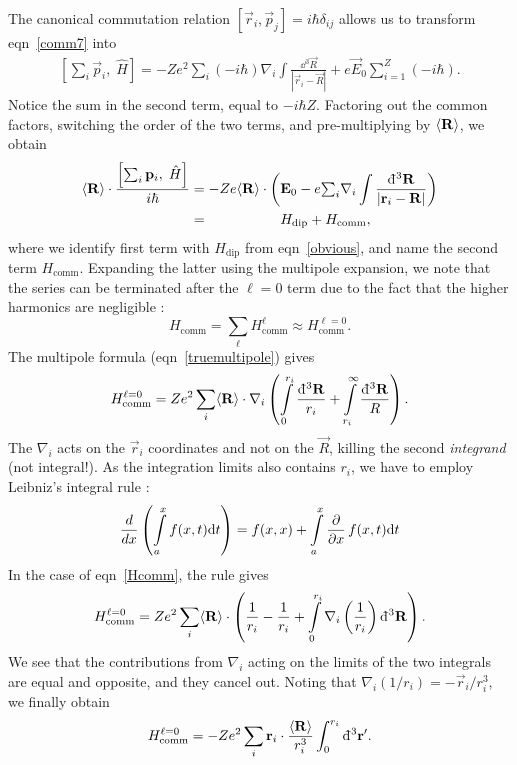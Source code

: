 The canonical commutation relation $[\vec
r_i,\vec p_j]=i\hbar\delta_{ij}$ allows us to transform eqn~\ref{comm7} into
%
\begin{align*}
    \left[\textstyle\sum_i\vec p_i,\;\hat H\right]  
    =-Ze^2{\textstyle\sum_i}(-i\hbar)\nabla_i
    \int\frac{\dd^3\vec R}{|\vec r_i-\vec R|}
    +e\vec E_0{\sum\limits_{i=1}^Z}(-i\hbar).
\end{align*}
%
Notice the sum in the second term, equal to $-i\hbar Z$. Factoring out the
common factors, switching the order of the two terms, and pre-multiplying by
$\langle \mathbf{R}\rangle$, we obtain
%
\begin{align}
    \ex{\vec R}\cdot
    \frac{\left[\textstyle\sum_i\vec p_i,\;\hat H\right]}{i\hbar}
    &=
    -Ze\ex{\vec R}\cdot\left(\vec E_0
    -e{\textstyle\sum_i}\nabla_i
    \int\frac{\dd^3\vec R}{|\vec r_i-\vec R|}
    \right)\nonumber\\
    \label{actualcomm}
    &=\hphantom{-Ze\ex{\vec R}\cdot\bigg(}H_\text{dip}+H_\text{comm},
\end{align}
%
where we identify first term with $H_\text{dip}$ from eqn~\ref{obvious}, and
name the second term $H_\text{comm}$. Expanding the latter using the multipole
expansion, we note that the series can be terminated after the $\ell=0$ term due
to the fact that the higher harmonics are negligible
\cite[sect~II]{flambaum2002nuclear}:
\begin{equation}
    \label{approxcomm}
H_\text{comm}=
\sum_\ell H_\text{comm}^{\ell}
\approx
H_\text{comm}^{\ell=0}.
\end{equation}
%
The multipole formula (eqn~\ref{truemultipole}) gives
%
\begin{equation}
    \label{Hcomm}
H_\text{comm}^{\ell=0}=
Ze^2\sum_i\langle \mathbf{R}\rangle\cdot\nabla_i\left(
    \int\limits_0^{r_i}\frac{\mathrm{d}\hspace*{-0.15em}\bar{}\hspace*{0.2em}^3\mathbf{R}}{r_i}
    +\int\limits_{r_i}^\infty\frac{\mathrm{d}\hspace*{-0.15em}\bar{}\hspace*{0.2em}^3\mathbf{R}}{R}
\right).
\end{equation}
%
The $\nabla_i$ acts on the $\vec r_i$ coordinates and not on the $\vec R$,
killing the second \emph{integrand} (not integral!). As the integration limits
also contains $r_i$, we have to employ Leibniz's integral rule
\cite{flanders1973differentiation}:
%
\[
\frac{d}{dx}\left(
\int\limits_a^xf(x,t)\mathrm{d} t\right)
=f(x,x)+
\int\limits_a^x\frac{\partial}{\partial x}\,f(x,t)\mathrm{d} t
\]
In the case of eqn~\ref{Hcomm}, the rule gives
%
\[
H_\text{comm}^{\ell=0}=
Ze^2\sum_i\langle \mathbf{R}\rangle\cdot\left(
\frac{1}{r_i}-\frac{1}{r_i}
+\int\limits_0^{r_i}\nabla_i\left(\frac{1}{r_i}\right)\mathrm{d}\hspace*{-0.15em}\bar{}\hspace*{0.2em}^3\mathbf{R}
\right).
\]
%
We see that the contributions from $\nabla_i$ acting on the limits of the two
integrals are equal and opposite, and they cancel out. Noting that
$\nabla_i(1/r_i)=-\vec r_i/r_i^3$, we finally obtain
%
\begin{equation}
    \label{l0comm}
H_\text{comm}^{\ell=0}=
-Ze^2\sum_i
    \mathbf{r}_i\cdot\frac{\langle \mathbf{R}\rangle}{r_i^3}
\int_0^{r_i}\mathrm{d}\hspace*{-0.15em}\bar{}\hspace*{0.2em}^3\mathbf{r}'.
\end{equation}

